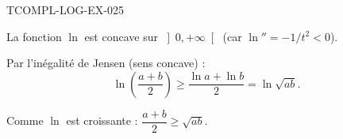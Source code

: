 \begin{corrige}{TCOMPL-LOG-EX-025}

La fonction $\ln$ est concave sur $\left]0, +\infty\right[$ (car $\ln'' = -1/t^2 < 0$).


Par l'inégalité de Jensen (sens concave) :
\[ \ln\!\left(\frac{a+b}{2}\right) \geq \frac{\ln a + \ln b}{2} = \ln\sqrt{ab}. \]

Comme $\ln$ est croissante : $\dfrac{a+b}{2} \geq \sqrt{ab}$.

\end{corrige}
